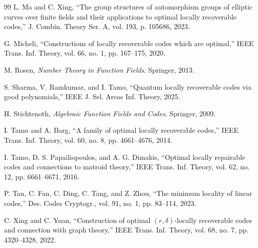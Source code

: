 \documentclass[1p,final]{elsarticle}
\newtheorem{open problem}[theorem]{Open Problem}
\begin{document}
\begin{thebibliography}{99}
L. Ma and C. Xing,
``The group structures of automorphism groups of elliptic curves over finite fields and their applications to optimal locally recoverable codes,''
J. Combin. Theory Ser. A, vol. 193, p. 105686, 2023.

G. Micheli,
``Constructions of locally recoverable codes which are optimal,''
IEEE Trans. Inf. Theory, vol. 66, no. 1, pp. 167--175, 2020.

M. Rosen,
\emph{Number Theory in Function Fields}.
Springer, 2013.

S. Sharma, V. Ramkumar, and I. Tamo,
``Quantum locally recoverable codes via good polynomials,''
IEEE J. Sel. Areas Inf. Theory, 2025.

H. Stichtenoth,
\emph{Algebraic Function Fields and Codes}.
Springer, 2009.

I. Tamo and A. Barg,
``A family of optimal locally recoverable codes,''
IEEE Trans. Inf. Theory, vol. 60, no. 8, pp. 4661--4676, 2014.

I. Tamo, D. S. Papailiopoulos, and A. G. Dimakis,
``Optimal locally repairable codes and connections to matroid theory,''
IEEE Trans. Inf. Theory, vol. 62, no. 12, pp. 6661--6671, 2016.

P. Tan, C. Fan, C. Ding, C. Tang, and Z. Zhou,
``The minimum locality of linear codes,''
Des. Codes Cryptogr., vol. 91, no. 1, pp. 83--114, 2023.

C. Xing and C. Yuan,
``Construction of optimal $(r,\delta)$-locally recoverable codes and connection with graph theory,''
IEEE Trans. Inf. Theory, vol. 68, no. 7, pp. 4320--4328, 2022.

\end{thebibliography}
	
\end{document}
